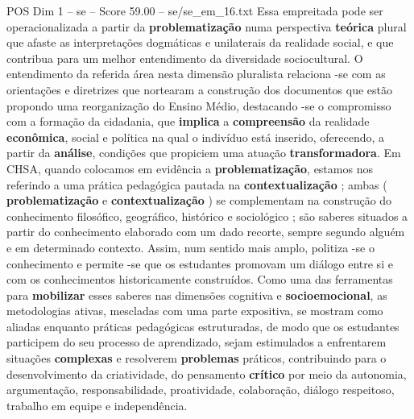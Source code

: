 \begin{textsample}{POS Dim 1 – se – Score 59.00 – se/se\_em\_16.txt}
Essa empreitada pode ser operacionalizada a partir da \textbf{problematização} numa perspectiva \textbf{teórica} plural que afaste as interpretações dogmáticas e unilaterais da realidade social, e que contribua para um melhor entendimento da diversidade sociocultural.
O entendimento da referida área nesta dimensão pluralista relaciona -se com as orientações e diretrizes que nortearam a construção dos documentos que estão propondo uma reorganização do Ensino Médio, destacando -se o compromisso com a formação da cidadania, que \textbf{implica} a \textbf{compreensão} da realidade \textbf{econômica}, social e política na qual o indivíduo está inserido, oferecendo, a partir da \textbf{análise}, condições que propiciem uma atuação \textbf{transformadora}.
Em CHSA, quando colocamos em evidência a \textbf{problematização}, estamos nos referindo a uma prática pedagógica pautada na \textbf{contextualização} ; ambas ( \textbf{problematização} e \textbf{contextualização} ) se complementam na construção do conhecimento filosófico, geográfico, histórico e sociológico ; são saberes situados a partir do conhecimento elaborado com um dado recorte, sempre segundo alguém e em determinado contexto.
Assim, num sentido mais amplo, politiza -se o conhecimento e permite -se que os estudantes promovam um diálogo entre si e com os conhecimentos historicamente construídos.
Como uma das ferramentas para \textbf{mobilizar} esses saberes nas dimensões cognitiva e \textbf{socioemocional}, as metodologias ativas, mescladas com uma parte expositiva, se mostram como aliadas enquanto práticas pedagógicas estruturadas, de modo que os estudantes participem do seu processo de aprendizado, sejam estimulados a enfrentarem situações \textbf{complexas} e resolverem \textbf{problemas} práticos, contribuindo para o desenvolvimento da criatividade, do pensamento \textbf{crítico} por meio da autonomia, argumentação, responsabilidade, proatividade, colaboração, diálogo respeitoso, trabalho em equipe e independência.

\end{textsample}
